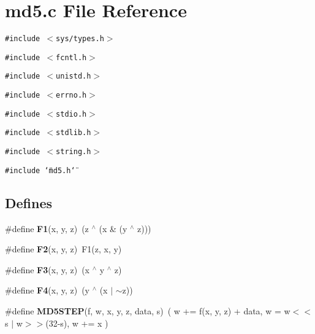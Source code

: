 \section{md5.c File Reference}
\label{md5_8c}
{\tt \#include $<$sys/types.h$>$}\par
{\tt \#include $<$fcntl.h$>$}\par
{\tt \#include $<$unistd.h$>$}\par
{\tt \#include $<$errno.h$>$}\par
{\tt \#include $<$stdio.h$>$}\par
{\tt \#include $<$stdlib.h$>$}\par
{\tt \#include $<$string.h$>$}\par
{\tt \#include \char`\"{}md5.h\char`\"{}}\par
\subsection*{Defines}
\begin{CompactItemize}
\item 
\#define {\bf F1}(x, y, z)\ (z $^\wedge$ (x \& (y $^\wedge$ z)))
\item 
\#define {\bf F2}(x, y, z)\ F1(z, x, y)
\item 
\#define {\bf F3}(x, y, z)\ (x $^\wedge$ y $^\wedge$ z)
\item 
\#define {\bf F4}(x, y, z)\ (y $^\wedge$ (x $|$ $\sim$z))
\item 
\#define {\bf MD5STEP}(f, w, x, y, z, data, s)\ ( w += f(x, y, z) + data,  w = w$<$$<$s $|$ w$>$$>$(32-s),  w += x )
\end{CompactItemize}
